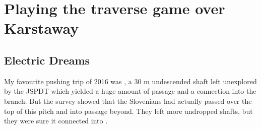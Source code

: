 
\begin{marginfigure}
\end{marginfigure}

\section{Playing the traverse game over Karstaway}

\subsection{Electric Dreams}

My favourite pushing trip of 2016 was , a 30 m undescended shaft left unexplored by the JSPDT  which yielded a huge amount of passage and a connection into the  branch. But the survey showed that the Slovenians had actually passed over the top of this pitch and into passage beyond. They left more undropped shafts, but they were sure it connected into .


